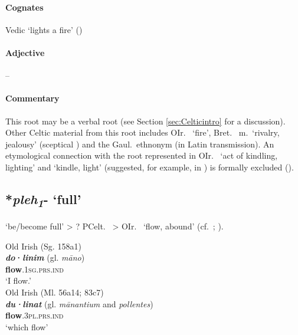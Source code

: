 \documentclass[output=paper,colorlinks,citecolor=brown]{langscibook}
\begin{document}
\paragraph*{Cognates}  

Vedic  ‘lights a fire’ ()

\paragraph*{Adjective}  -- 

\paragraph*{Commentary} 

This root may be a verbal root (see Section \ref{sec:Celticintro} for a discussion). Other Celtic material from this root includes OIr.\   ‘fire’, Bret.\  m.\ ‘rivalry, jealousy’ (sceptical ) and the Gaul.\ ethnonym  (in Latin transmission). An etymological connection with the root  represented in OIr.\   ‘act of kindling, lighting’ and  ‘kindle, light’ (suggested, for example, in ) is formally excluded (\citealt[375]{Schumacher2004}).

\subsection{*\textit{pleh\textsubscript{1}}- ‘full’}
\label{sec:NIPfull}

 ‘be/become full’ > ? PCelt.\  > OIr.\  ‘flow, abound’ (cf.\ \citealt[18, 21, 34--35]{McCone1991}; \citealt[374--375]{Schumacher2004}).

\begin{exe}
    \ex Old Irish (Sg. 158a1) \label{ex:NIPfull1}\\
        \gll \textbf{\textit{do}·\textit{linim}}  (gl. \textit{māno}) \\
        \textbf{flow}.\textsc{1sg.prs.ind}\\
        \glt ‘I flow.’\\
    \ex Old Irish (Ml. 56a14; 83c7) \label{ex:NIPfull2}\\
        \gll \textbf{\textit{du·linat}}  (gl. \textit{mānantium} and \textit{pollentes})\\
        \textbf{flow}.\textsc{3pl.prs.ind}\\
        \glt ‘which flow’\\
\end{exe}
\end{document}
